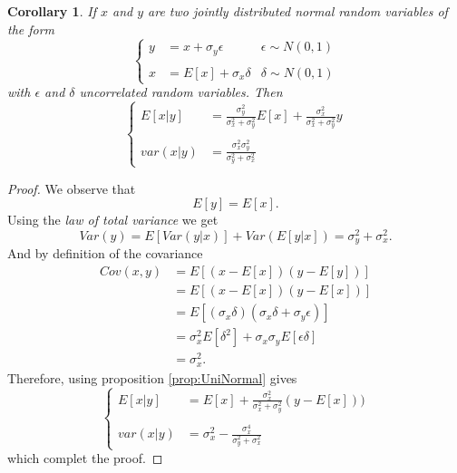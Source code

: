 \documentclass{article}
\newtheorem{cor}[thm]{Corollary}
\theoremstyle{definition}
\theoremstyle{remark}
\begin{document}
\begin{cor}
If $x$ and $y$ are two jointly distributed normal random variables of the form
\begin{equation*}
\left\{ 
\begin{array}{rlr}
y&=x+\sigma_y\epsilon&\epsilon \sim N(0,1) \\
\\
x&=E[x]+\sigma_x\delta&\delta \sim N(0,1)
\end{array} \right.
\end{equation*}
with $\epsilon$ and $\delta$ uncorrelated random variables.
Then
\begin{equation*}
\left\{ 
\begin{array}{rl}
E[x|y]&=\frac{\sigma_y^2}{\sigma_x^2+\sigma_y^2}E[x]+\frac{\sigma_x^2}{\sigma_x^2+\sigma_y^2}y\\
\\
var(x|y)&=\frac{\sigma_x^2\sigma_y^2}{\sigma_y^2+\sigma_x^2}
\end{array} \right.
\end{equation*}
\end{cor}

\begin{proof}
We observe that
$$E[y]=E[x].$$
Using the \textit{law of total variance} we get
$$Var(y)= E[Var(y|x)]+Var(E[y|x])=\sigma_y^2+\sigma_x^2.$$
And by definition of the covariance
\begin{align*}
Cov(x,y)&=E[(x-E[x])(y-E[y])]\\
&=E[(x-E[x])(y-E[x])]\\
&=E[(\sigma_x\delta)(\sigma_x\delta+\sigma_y\epsilon)]\\
&=\sigma_x^2E[\delta^2]+\sigma_x\sigma_yE[\epsilon\delta]\\
&=\sigma_x^2.
\end{align*}
Therefore, using proposition \ref{prop:UniNormal} gives
\begin{equation*}
\left\{ 
\begin{array}{rl}
E[x|y]&=E[x]+\frac{\sigma_x^2}{\sigma_x^2+\sigma_y^2}(y-E[x]))\\
\\
var(x|y)&=\sigma_x^2-\frac{\sigma_x^4}{\sigma_y^2+\sigma_x^2}
\end{array} \right.
\end{equation*}
which complet the proof.
\end{proof}
\end{document}
